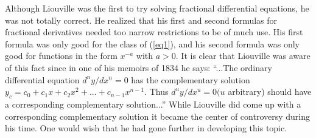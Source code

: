\documentclass[a4paper,14pt,oneside]{book}
\theoremstyle{plain}
\theoremstyle{definition}
\theoremstyle{remark}
\begin{document}
\begin{center}
\begin{flushleft}
{\par{Although Liouville was the first to try solving fractional differential equations, he was not totally correct. He realized that his first and second formulas for fractional derivatives needed too narrow restrictions to be of much use. His first formula was only good for the class of (\ref{eq1}), and his second formula was only good for functions in the form $x^{-a}$ with $a>0$. It is clear that Liouville was aware of this fact since in one of his memoirs of 1834 \cite{bb5} he says: \enquote{...The ordinary differential equation $d^{n} y / d x^{n}=0$ has the complementary solution $y_c=c_0+c_1x+c_2x^2+...+c_{n-1}x^{n-1}$. Thus $d^{u}y / dx^{u}=0(u $ arbitrary) should have a corresponding complementary solution...} While Liouville did come up with a corresponding complementary solution it became the center of controversy during his time. One would wish that he had gone further in developing this topic.}}
\end{flushleft}        
\end{center}
\end{document}
